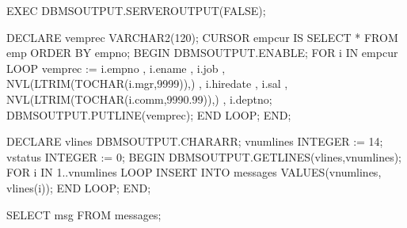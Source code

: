 \documentclass[letterpaper,10pt,english,openany,oneside]{sphinxmanual}
\begin{document}
%
\begin{sphinxVerbatim}[commandchars=\\\{\}]
EXEC DBMS\PYGZus{}OUTPUT.SERVEROUTPUT(FALSE);

DECLARE
    v\PYGZus{}emprec        VARCHAR2(120);
    CURSOR emp\PYGZus{}cur IS SELECT * FROM emp ORDER BY empno;
BEGIN
    DBMS\PYGZus{}OUTPUT.ENABLE;
    FOR i IN emp\PYGZus{}cur LOOP
        v\PYGZus{}emprec := i.empno \textbar{}\textbar{} \PYGZsq{},\PYGZsq{} \textbar{}\textbar{} i.ename \textbar{}\textbar{} \PYGZsq{},\PYGZsq{} \textbar{}\textbar{} i.job \textbar{}\textbar{} \PYGZsq{},\PYGZsq{} \textbar{}\textbar{}
            NVL(LTRIM(TO\PYGZus{}CHAR(i.mgr,\PYGZsq{}9999\PYGZsq{})),\PYGZsq{}\PYGZsq{}) \textbar{}\textbar{} \PYGZsq{},\PYGZsq{} \textbar{}\textbar{} i.hiredate \textbar{}\textbar{}
            \PYGZsq{},\PYGZsq{} \textbar{}\textbar{} i.sal \textbar{}\textbar{} \PYGZsq{},\PYGZsq{} \textbar{}\textbar{}
            NVL(LTRIM(TO\PYGZus{}CHAR(i.comm,\PYGZsq{}9990.99\PYGZsq{})),\PYGZsq{}\PYGZsq{}) \textbar{}\textbar{} \PYGZsq{},\PYGZsq{} \textbar{}\textbar{} i.deptno;
        DBMS\PYGZus{}OUTPUT.PUT\PYGZus{}LINE(v\PYGZus{}emprec);
    END LOOP;
END;

DECLARE
    v\PYGZus{}lines         DBMS\PYGZus{}OUTPUT.CHARARR;
    v\PYGZus{}numlines      INTEGER := 14;
    v\PYGZus{}status        INTEGER := 0;
BEGIN
    DBMS\PYGZus{}OUTPUT.GET\PYGZus{}LINES(v\PYGZus{}lines,v\PYGZus{}numlines);
    FOR i IN 1..v\PYGZus{}numlines LOOP
        INSERT INTO messages VALUES(v\PYGZus{}numlines, v\PYGZus{}lines(i));
    END LOOP;
END;

SELECT msg FROM messages;


\end{sphinxVerbatim}
\end{document}

